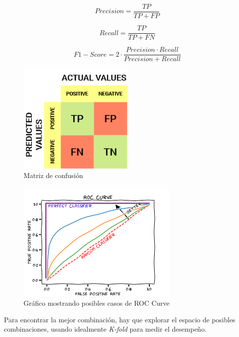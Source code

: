 \documentclass[titlepage,a4paper]{article}
\begin{document}
\begin{equation}
    Precision = \frac{TP}{TP+FP}
\end{equation}


\begin{equation}
    Recall = \frac{TP}{TP+FN}
\end{equation}

\begin{equation}
    F1-Score = 2 \cdot \frac{Precision \cdot Recall}{Precision + Recall}
\end{equation}

\begin{figure}[!htb]
    \centering
    \includegraphics[width=0.5\textwidth]{imagenesResumen/MatrizDeConfusion.png}
    \caption{Matriz de confusión}
    \label{MatrizDeConfusion}
\end{figure}

\begin{figure}[!htb]
    \centering
    \includegraphics[width=0.7\textwidth]{imagenesResumen/ROCCurve.png}
    \caption{Gráfico mostrando posibles casos de ROC Curve}
    \label{ROCCurve}
\end{figure}



Para encontrar la mejor combinación, hay que explorar el espacio de posibles combinaciones, usando idealmente \textit{K-fold} para medir el desempeño.
\end{document}
